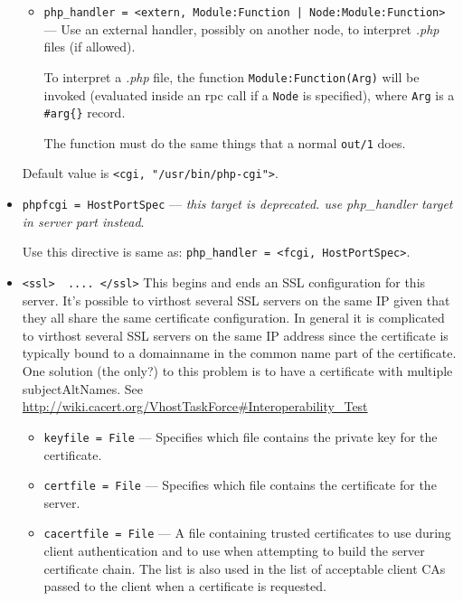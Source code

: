 \documentclass[11pt,oneside,english]{book}
\begin{document}
\begin{itemize}
\begin{itemize}
              \item \verb+php_handler = <extern, Module:Function | Node:Module:Function>+
                --- Use an external handler, possibly on another node, to
                interpret \textit{.php} files (if allowed).

                To interpret a \textit{.php} file, the function
                \verb+Module:Function(Arg)+ will be invoked (evaluated
                inside an rpc call if a \verb+Node+ is specified),
                where \verb+Arg+ is a \verb+#arg{}+ record.

                The function must do the same things that a normal
                \verb+out/1+ does.

              \end{itemize}
              Default value is \verb+<cgi, "/usr/bin/php-cgi">+.

\item       \verb+phpfcgi = HostPortSpec+ ---
              \textit{this target is deprecated. use php\_handler target in
                server part instead}.

              Use this directive is same as:
              \verb+php_handler = <fcgi, HostPortSpec>+.

\item        \verb+<ssl>  .... </ssl>+
               This begins and ends an SSL configuration for this server. It's
               possible to virthost several SSL servers on the same IP given
               that they all share the same certificate configuration. In
               general it is complicated to virthost several SSL servers on the
               same IP address since the certificate is typically bound to a
               domainname in the common name part of the certificate. One
               solution (the only?)  to this problem is to have a certificate
               with multiple subjectAltNames. See
               \url{http://wiki.cacert.org/VhostTaskForce#Interoperability_Test}

               \begin{itemize}
               \item \verb+keyfile = File+ --- Specifies which file contains the
                 private key for the certificate.

               \item \verb+certfile = File+ --- Specifies which file contains
                 the certificate for the server.

               \item \verb+cacertfile = File+ --- A file containing trusted
                 certificates to use during client authentication and to use
                 when attempting to build the server certificate chain. The list
                 is also used in the list of acceptable client CAs passed to the
                 client when a certificate is requested.


\end{itemize}
\end{itemize}
\end{document}

